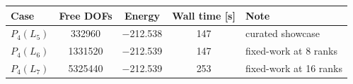 \begin{tabular}{@{}l c c c l@{}}
\toprule
Case & Free DOFs & Energy & Wall time [s] & Note \\
\midrule
$P_{4}(L_{5})$ & \num{332960} & \num{-212.538} & \num{147} & curated showcase \\
$P_{4}(L_{6})$ & \num{1331520} & \num{-212.539} & \num{147} & fixed-work at 8 ranks \\
$P_{4}(L_{7})$ & \num{5325440} & \num{-212.539} & \num{253} & fixed-work at 16 ranks \\
\bottomrule
\end{tabular}
